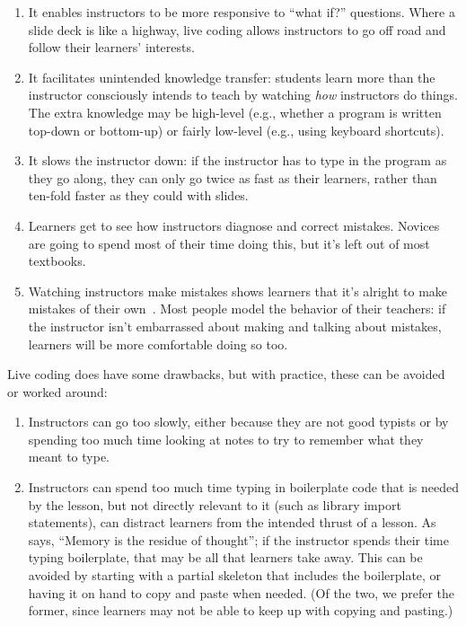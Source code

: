 \documentclass{article}
\begin{document}
\begin{enumerate}

\item It enables instructors to be more responsive to ``what if?''
  questions. Where a slide deck is like a highway, live coding
  allows instructors to go off road and follow their learners'
  interests.

\item It facilitates unintended knowledge transfer: students learn
  more than the instructor consciously intends to teach by watching
  \textit{how} instructors do things.  The extra knowledge may be
  high-level (e.g., whether a program is written top-down or
  bottom-up) or fairly low-level (e.g., using keyboard shortcuts).

\item It slows the instructor down: if the instructor has to type in
  the program as they go along, they can only go twice as fast as
  their learners, rather than ten-fold faster as they could with
  slides.

\item Learners get to see how instructors diagnose and correct
  mistakes. Novices are going to spend most of their time doing
  this, but it's left out of most textbooks.

\item Watching instructors make mistakes shows learners that it's
  alright to make mistakes of their own~\citep{barker-live-coding}.
  Most people model the behavior of their teachers: if the instructor
  isn't embarrassed about making and talking about mistakes, learners
  will be more comfortable doing so too.

\end{enumerate}

Live coding does have some drawbacks, but with practice, these can be
avoided or worked around:

\begin{enumerate}

\item Instructors can go too slowly, either because they are not good
  typists or by spending too much time looking at notes to try to
  remember what they meant to type.

\item Instructors can spend too much time typing in boilerplate code
  that is needed by the lesson, but not directly relevant to it (such
  as library import statements), can distract learners from the
  intended thrust of a lesson.  As \citet{willingham-book} says,
  ``Memory is the residue of thought''; if the instructor spends their
  time typing boilerplate, that may be all that learners take away.
  This can be avoided by starting with a partial skeleton that
  includes the boilerplate, or having it on hand to copy and paste
  when needed.  (Of the two, we prefer the former, since learners
  may not be able to keep up with copying and pasting.)

\end{enumerate}
\end{document}
